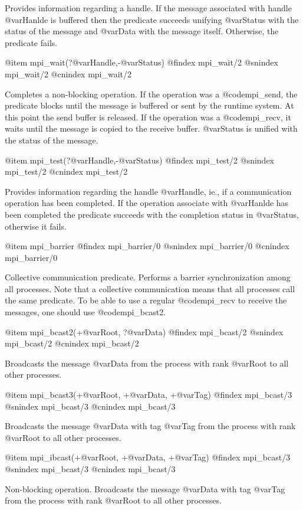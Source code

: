 {{{{{{{{Provides information regarding a handle. If the message associated
with handle @var{Hanlde} is buffered then the predicate succeeds
unifying @var{Status} with the status of the message and @var{Data}
with the message itself. Otherwise, the predicate fails.


@item mpi_wait(?@var{Handle},-@var{Status})
@findex mpi_wait/2
@snindex mpi_wait/2
@cnindex mpi_wait/2

Completes a non-blocking operation. If the operation was a
@code{mpi_send}, the predicate blocks until the message is buffered
or sent by the runtime system. At this point the send buffer is
released. If the operation was a @code{mpi_recv}, it waits until the
message is copied to the receive buffer. @var{Status} is unified with
the status of the message.

@item mpi_test(?@var{Handle},-@var{Status})
@findex mpi_test/2
@snindex mpi_test/2
@cnindex mpi_test/2

Provides information regarding the handle @var{Handle}, ie., if a
communication operation has been completed.  If the operation
associate with @var{Hanlde} has been completed the predicate succeeds
with the completion status in @var{Status}, otherwise it fails.

@item mpi_barrier
@findex mpi_barrier/0
@snindex mpi_barrier/0
@cnindex mpi_barrier/0

Collective communication predicate.  Performs a barrier
synchronization among all processes. Note that a collective
communication means that all processes call the same predicate. To be
able to use a regular @code{mpi_recv} to receive the messages, one
should use @code{mpi_bcast2}.


@item mpi_bcast2(+@var{Root}, ?@var{Data})
@findex mpi_bcast/2
@snindex mpi_bcast/2
@cnindex mpi_bcast/2

Broadcasts the message @var{Data} from the process with rank @var{Root}
to all other processes.

@item mpi_bcast3(+@var{Root}, +@var{Data}, +@var{Tag})
@findex mpi_bcast/3
@snindex mpi_bcast/3
@cnindex mpi_bcast/3

Broadcasts the message @var{Data} with tag @var{Tag} from the process with rank @var{Root}
to all other processes.

@item mpi_ibcast(+@var{Root}, +@var{Data}, +@var{Tag})
@findex mpi_bcast/3
@snindex mpi_bcast/3
@cnindex mpi_bcast/3

Non-blocking operation. Broadcasts the message @var{Data} with tag @var{Tag}
from the process with rank @var{Root} to all other processes.

}}}}}}}}
